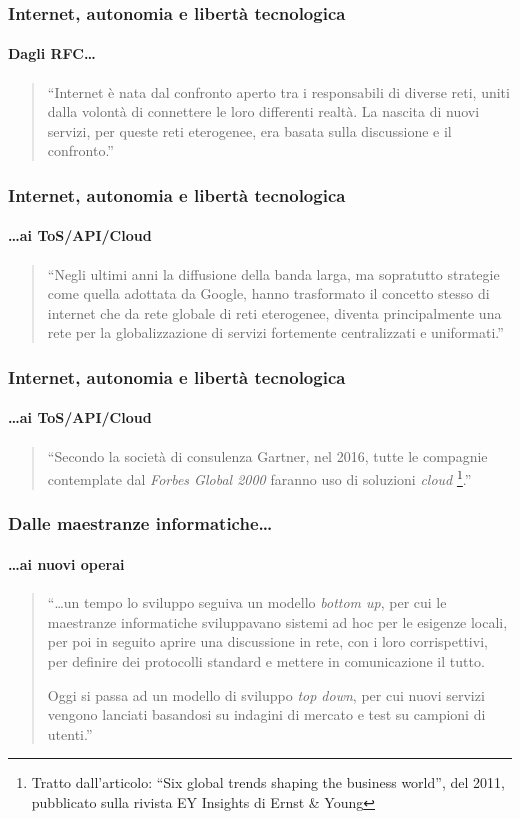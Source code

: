 \documentclass{beamer}
\begin{document}
\begin{frame}
  \frametitle{Internet, autonomia e libertà tecnologica}
  \framesubtitle{Dagli RFC\ldots}
  \begin{quote}
  ``Internet è nata dal confronto aperto tra i responsabili di diverse
  reti, uniti dalla volontà di connettere le loro differenti
  realtà. La nascita di nuovi servizi, per queste reti eterogenee, era
  basata sulla discussione e il confronto.'' 
\end{quote}

\end{frame}

\begin{frame}
  \frametitle{Internet, autonomia e libertà tecnologica}
  \framesubtitle{\ldots ai ToS/API/Cloud}
  \begin{quote}
  ``Negli ultimi anni la diffusione della banda larga, ma sopratutto
  strategie come quella adottata da Google, hanno  trasformato il 
  concetto stesso di internet che da rete globale di reti eterogenee,
  diventa principalmente una rete per la globalizzazione di servizi
  fortemente centralizzati e uniformati.'' 
  \end{quote}
\end{frame}

\begin{frame}
  \frametitle{Internet, autonomia e libertà tecnologica}
  \framesubtitle{\ldots ai ToS/API/Cloud}
  \begin{quote}
    ``Secondo la società di consulenza Gartner, nel 2016, tutte le
    compagnie contemplate dal \emph{Forbes Global 2000} faranno uso di
    soluzioni \emph{cloud} \footnote{Tratto dall'articolo: ``Six global trends
      shaping the business world'', del 2011, pubblicato sulla rivista EY
      Insights di Ernst \& Young}.''
  \end{quote}
\end{frame}

\begin{frame}
  \frametitle{Dalle maestranze informatiche\ldots}
  \framesubtitle{\ldots ai nuovi operai}
  \begin{quotation}
    ``\ldots un tempo lo sviluppo seguiva un modello \emph{bottom up}, per
    cui le maestranze informatiche sviluppavano sistemi ad hoc per le
    esigenze locali, per poi in seguito aprire una discussione in
    rete, con i loro corrispettivi, per definire dei protocolli
    standard e mettere in comunicazione il tutto.

    Oggi si passa ad un modello di sviluppo \emph{top down}, per cui
    nuovi servizi vengono lanciati basandosi su indagini di mercato e
    test su campioni di utenti.''
  \end{quotation}
\end{frame}
\end{document}
